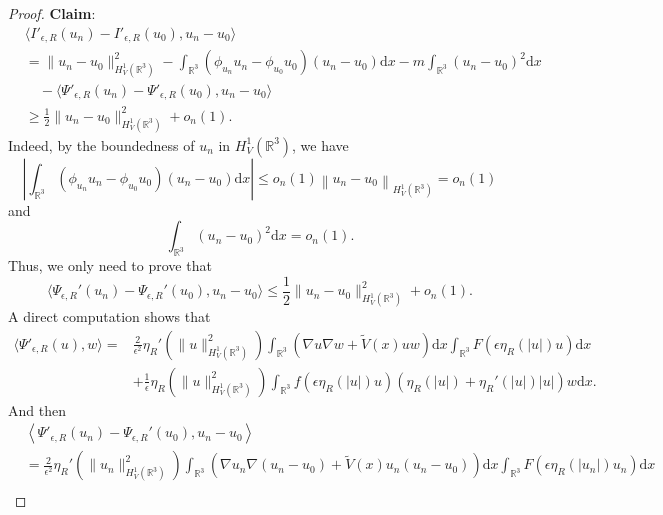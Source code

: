 \documentclass[10pt,a4paper]{amsart}
\begin{document}
\begin{proof}
{\bf Claim}:
\begin{equation*}
    \begin{aligned}
     &\langle I'_{\epsilon,R}(u_n) - I'_{\epsilon,R}(u_0), u_n - u_0 \rangle \\
&= \|u_n - u_0\|_{H^1_V(\mathbb{R}^3)}^2-\int_{\mathbb{R}^3} (\phi_{u_n}u_n - \phi_{u_0}u_0)(u_n - u_0) \text{d}x -m\int_{\mathbb{R}^3}(u_n-u_0)^2\text{d}x\\
&\quad- \langle \Psi'_{\epsilon,R}(u_n) - \Psi'_{\epsilon,R}(u_0), u_n - u_0 \rangle\\
&\geq \frac{1}{2}\|u_n-u_0\|_{H^{1}_V(\mathbb{R}^3)}^{2}+o_n(1).
    \end{aligned}
\end{equation*}
Indeed, by the boundedness of ${u_n}$ in $H^{1}_{V}(\mathbb{R}^3)$, we have
\begin{equation*}
    \left |\int_{\mathbb{R}^{3}}\left ( \phi _{u_{n}} u_{n}-\phi _{u_{0}}u_{0}\right )\left ( u_{n}-u_{0} \right ) \text{d}x\right |\leq o_{n}\left ( 1 \right )\left\| u_{n}-u_{0}\right\|_{H^{1}_{V}(\mathbb{R}^3)}=o_{n}\left ( 1 \right )
\end{equation*}
and
\begin{equation*}
    \int_{\mathbb{R}^3}(u_n-u_0)^2\text{d}x=o_{n}(1).
\end{equation*}
Thus, we only need to prove that
\begin{equation*}
    \langle \Psi_{\epsilon,R}'(u_n) - \Psi_{\epsilon,R}'(u_0), u_n - u_0 \rangle \leq\frac{1}{2}\|u_n-u_0\|_{H^{1}_V(\mathbb{R}^3)}^{2}+o_n(1).
\end{equation*}
A direct computation shows that
\begin{align*}
\langle \Psi'_{\epsilon,R}(u), w \rangle =
& \frac{2}{\epsilon^2} \eta_R'(\|u\|_{H^1_{V}(\mathbb{R}^3)}^2) \int_{\mathbb{R}^3}(\nabla u\nabla w+\tilde V(x)uw) \text{d}x \int_{\mathbb{R}^3} F(\epsilon \eta_R(|u|) u)  \text{d}x \\
&+ \frac{1}{\epsilon} \eta_R(\|u\|_{H^1_{V}(\mathbb{R}^3)}^2) \int_{\mathbb{R}^3} f(\epsilon \eta_R(|u|) u) \left(\eta_R(|u|) + \eta_R'(|u|)|u| \right) w \text{d}x.
\end{align*}
And then
\begin{align}
      &\left<  \Psi'_{\epsilon,R} \left ( u_{n} \right )-\Psi_{\epsilon ,R}'\left ( u_{0} \right ),u_{n}-u_{0}\right>\nonumber \\
      &= \frac{2}{\epsilon^2} \eta_R'(\|u_n\|_{H^1_{V}(\mathbb{R}^3)}^2) \int_{\mathbb{R}^3}(\nabla u_n\nabla (u_{n}-u_{0})+\tilde V(x)u_n(u_{n}-u_{0})) \text{d}x \int_{\mathbb{R}^3} F(\epsilon \eta_R(|u_n|) u_n) \text{d}x \tag{T1}\\

\end{align}
\end{proof}
\end{document}
